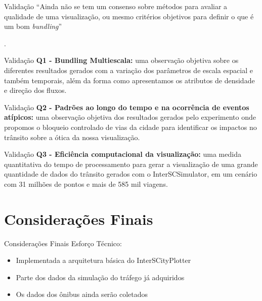 \begin{frame}{Validação}
	\centering
 ``Ainda não se tem um consenso sobre métodos para avaliar a
qualidade de uma visualização, ou mesmo critérios objetivos para definir o
que é um bom \emph{bundling}''

	\hfill \citep{Lhuillier2017}.
\end{frame}

\begin{frame}{Validação}
	\textbf{Q1 - Bundling Multiescala:} uma observação objetiva sobre os
diferentes resultados gerados com a variação dos parâmetros de escala espacial
e também temporais, além da forma como apresentamos os atributos de densidade e
direção dos fluxos.
\end{frame}

\begin{frame}{Validação}
	\textbf{Q2 - Padrões ao longo do tempo e na ocorrência de eventos atípicos:} uma observação objetiva dos
resultados gerados pelo experimento onde propomos o bloqueio controlado de vias
da cidade para identificar os impactos no trânsito sobre a ótica da nossa
visualização.
\end{frame}

\begin{frame}{Validação}
	\textbf{Q3 - Eficiência computacional da visualização:} uma medida
quantitativa do tempo de processamento para gerar a visualização de uma grande
quantidade de dados do trânsito gerados com o InterSCSimulator, em um cenário
com 31 milhões de pontos e mais de 585 mil viagens.	
\end{frame}

\section{Considerações Finais}

\begin{frame}{Considerações Finais}
	Esforço Técnico:
	\begin{itemize}
		\item Implementada a arquitetura básica do InterSCityPlotter
		\item Parte dos dados da simulação do tráfego já adquiridos
		\item Os dados dos ônibus ainda serão coletados
	\end{itemize}

\end{frame}

